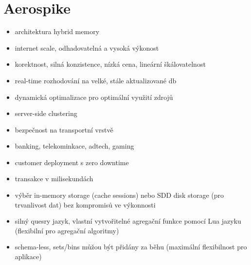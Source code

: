 \documentclass[czech,bachelor,dept460,male,csharp,cpdeclaration]{diploma}
\begin{document}
	\section{Aerospike}
		\begin{itemize}
			\item architektura hybrid memory
			\item internet scale, odhadovatelná a vysoká výkonost
			\item korektnost, silná konzistence, nízká cena, lineární škálovatelnost
			\item real-time rozhodování na velké, stále aktualizované db
			\item dynamická optimalizace pro optimální využití zdrojů
			\item server-side clustering
			\item bezpečnost na transportní vrstvě
			\item banking, telekominkace, adtech, gaming
			\item customer deployment s zero downtime
			\item transakce v milisekundách
			\item výběr in-memory storage (cache sessions) nebo SDD disk storage (pro trvanlivost dat) bez kompromisů ve výkonnosti
			\item silný quesry jazyk, vlastní vytvořitelné agregační funkce pomocí Lua jazyku (flexibilní pro agregační algoritmy)
			\item schema-less, sets/bins můžou být přidány za běhu (maximální flexibilnost pro aplikace)
		\end{itemize}
 
	
\end{document}

